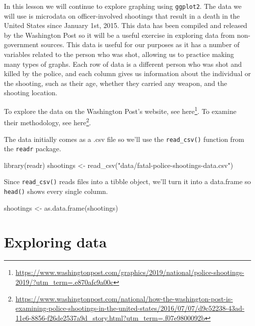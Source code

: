 \documentclass[
]{krantz}
\makeatletter
\newenvironment{Shaded}{\begin{snugshade}}{\end{snugshade}}
\newcommand{\FunctionTok}[1]{\textcolor[rgb]{0,0,0}{#1}}
\newcommand{\NormalTok}[1]{#1}
\newcommand{\OtherTok}[1]{\textcolor[rgb]{0.37,0.37,0.37}{#1}}
\newcommand{\StringTok}[1]{\textcolor[rgb]{0.5,0.5,0.5}{#1}}
\renewcommand{\href}[2]{#2\footnote{\url{#1}}}
\newenvironment{kframe}{%
\medskip{}
\setlength{\fboxsep}{.8em}
 \def\at@end@of@kframe{}%
 \ifinner\ifhmode%
  \def\at@end@of@kframe{\end{minipage}}%
  \begin{minipage}{\columnwidth}%
 \fi\fi%
 \def\FrameCommand##1{\hskip\@totalleftmargin \hskip-\fboxsep
 \colorbox{shadecolor}{##1}\hskip-\fboxsep
     \hskip-\linewidth \hskip-\@totalleftmargin \hskip\columnwidth}%
 \MakeFramed {\advance\hsize-\width
   \@totalleftmargin\z@ \linewidth\hsize
   \@setminipage}}%
 {\par\unskip\endMakeFramed%
 \at@end@of@kframe}
\renewenvironment{Shaded}{\begin{kframe}}{\end{kframe}}
\makeatother
\begin{document}
In this lesson we will continue to explore graphing using
\texttt{ggplot2}. The data we will use is microdata on
officer-involved shootings that result in a death in the
United States since January 1st, 2015. This data has been
compiled and released by the Washington Post so it will be a
useful exercise in exploring data from non-government
sources. This data is useful for our purposes as it has a
number of variables related to the person who was shot,
allowing us to practice making many types of graphs. Each
row of data is a different person who was shot and killed by
the police, and each column gives us information about the
individual or the shooting, such as their age, whether they
carried any weapon, and the shooting location.

To explore the data on the Washington Post's website, see
\href{https://www.washingtonpost.com/graphics/2019/national/police-shootings-2019/?utm_term=.e870afc9a00c}{here}.
To examine their methodology, see
\href{https://www.washingtonpost.com/national/how-the-washington-post-is-examining-police-shootings-in-the-united-states/2016/07/07/d9c52238-43ad-11e6-8856-f26de2537a9d_story.html?utm_term=.f07e9800092b}{here}.

The data initially comes as a .csv file so we'll use the
\texttt{read\_csv()} function from the \texttt{readr}
package.

\begin{Shaded}
\begin{Highlighting}[]
\FunctionTok{library}\NormalTok{(readr)}
\NormalTok{shootings }\OtherTok{\textless{}{-}} \FunctionTok{read\_csv}\NormalTok{(}\StringTok{"data/fatal{-}police{-}shootings{-}data.csv"}\NormalTok{)}
\end{Highlighting}
\end{Shaded}

Since \texttt{read\_csv()} reads files into a tibble object,
we'll turn it into a data.frame so \texttt{head()} shows
every single column.

\begin{Shaded}
\begin{Highlighting}[]
\NormalTok{shootings }\OtherTok{\textless{}{-}} \FunctionTok{as.data.frame}\NormalTok{(shootings)}
\end{Highlighting}
\end{Shaded}

\hypertarget{exploring-data}{%
\section{Exploring data}\label{exploring-data}}
\end{document}
